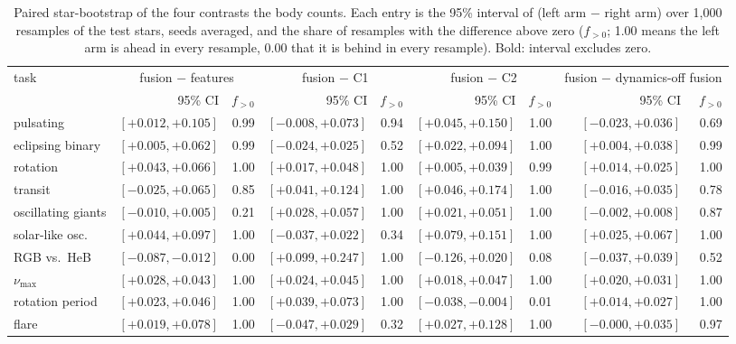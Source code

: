 \documentclass{article}
\begin{document}
\begin{table}[H]
\caption{Paired star-bootstrap of the four contrasts the body counts. Each entry is the 95\% interval
of (left arm $-$ right arm) over 1{,}000 resamples of the test stars, seeds averaged, and the share of
resamples with the difference above zero ($f_{>0}$; 1.00 means the left arm is ahead in every
resample, 0.00 that it is behind in every resample). Bold: interval excludes zero.}
\label{tab:bootstrap}
\centering
\scriptsize
\setlength{\tabcolsep}{2pt}
\begin{tabular}{lrrrrrrrr}
\toprule
task & \multicolumn{2}{c}{fusion $-$ features} & \multicolumn{2}{c}{fusion $-$ C1} & \multicolumn{2}{c}{fusion $-$ C2} & \multicolumn{2}{c}{fusion $-$ dynamics-off fusion} \\
 & 95\% CI & $f_{>0}$ & 95\% CI & $f_{>0}$ & 95\% CI & $f_{>0}$ & 95\% CI & $f_{>0}$ \\
\midrule
pulsating & $\mathbf{[+0.012, +0.105]}$ & 0.99 & $[-0.008, +0.073]$ & 0.94 & $\mathbf{[+0.045, +0.150]}$ & 1.00 & $[-0.023, +0.036]$ & 0.69 \\
eclipsing binary & $\mathbf{[+0.005, +0.062]}$ & 0.99 & $[-0.024, +0.025]$ & 0.52 & $\mathbf{[+0.022, +0.094]}$ & 1.00 & $\mathbf{[+0.004, +0.038]}$ & 0.99 \\
rotation & $\mathbf{[+0.043, +0.066]}$ & 1.00 & $\mathbf{[+0.017, +0.048]}$ & 1.00 & $\mathbf{[+0.005, +0.039]}$ & 0.99 & $\mathbf{[+0.014, +0.025]}$ & 1.00 \\
transit & $[-0.025, +0.065]$ & 0.85 & $\mathbf{[+0.041, +0.124]}$ & 1.00 & $\mathbf{[+0.046, +0.174]}$ & 1.00 & $[-0.016, +0.035]$ & 0.78 \\
oscillating giants & $[-0.010, +0.005]$ & 0.21 & $\mathbf{[+0.028, +0.057]}$ & 1.00 & $\mathbf{[+0.021, +0.051]}$ & 1.00 & $[-0.002, +0.008]$ & 0.87 \\
solar-like osc. & $\mathbf{[+0.044, +0.097]}$ & 1.00 & $[-0.037, +0.022]$ & 0.34 & $\mathbf{[+0.079, +0.151]}$ & 1.00 & $\mathbf{[+0.025, +0.067]}$ & 1.00 \\
RGB vs.\ HeB & $\mathbf{[-0.087, -0.012]}$ & 0.00 & $\mathbf{[+0.099, +0.247]}$ & 1.00 & $[-0.126, +0.020]$ & 0.08 & $[-0.037, +0.039]$ & 0.52 \\
$\nu_{\max}$ & $\mathbf{[+0.028, +0.043]}$ & 1.00 & $\mathbf{[+0.024, +0.045]}$ & 1.00 & $\mathbf{[+0.018, +0.047]}$ & 1.00 & $\mathbf{[+0.020, +0.031]}$ & 1.00 \\
rotation period & $\mathbf{[+0.023, +0.046]}$ & 1.00 & $\mathbf{[+0.039, +0.073]}$ & 1.00 & $\mathbf{[-0.038, -0.004]}$ & 0.01 & $\mathbf{[+0.014, +0.027]}$ & 1.00 \\
flare & $\mathbf{[+0.019, +0.078]}$ & 1.00 & $[-0.047, +0.029]$ & 0.32 & $\mathbf{[+0.027, +0.128]}$ & 1.00 & $[-0.000, +0.035]$ & 0.97 \\
\bottomrule
\end{tabular}

\end{table}
\end{document}
